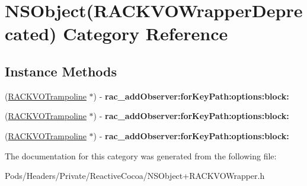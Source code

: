 \hypertarget{category_n_s_object_07_r_a_c_k_v_o_wrapper_deprecated_08}{}\section{N\+S\+Object(R\+A\+C\+K\+V\+O\+Wrapper\+Deprecated) Category Reference}
\label{category_n_s_object_07_r_a_c_k_v_o_wrapper_deprecated_08}
\subsection*{Instance Methods}
\begin{DoxyCompactItemize}
\item 
\mbox{\label{category_n_s_object_07_r_a_c_k_v_o_wrapper_deprecated_08_a34822ef41afb792012df4f28f3d0bbe3}} 
(\mbox{\hyperlink{interface_r_a_c_k_v_o_trampoline}{R\+A\+C\+K\+V\+O\+Trampoline}} $\ast$) -\/ {\bfseries rac\+\_\+add\+Observer\+:for\+Key\+Path\+:options\+:block\+:}
\item 
\mbox{\label{category_n_s_object_07_r_a_c_k_v_o_wrapper_deprecated_08_a34822ef41afb792012df4f28f3d0bbe3}} 
(\mbox{\hyperlink{interface_r_a_c_k_v_o_trampoline}{R\+A\+C\+K\+V\+O\+Trampoline}} $\ast$) -\/ {\bfseries rac\+\_\+add\+Observer\+:for\+Key\+Path\+:options\+:block\+:}
\item 
\mbox{\label{category_n_s_object_07_r_a_c_k_v_o_wrapper_deprecated_08_a34822ef41afb792012df4f28f3d0bbe3}} 
(\mbox{\hyperlink{interface_r_a_c_k_v_o_trampoline}{R\+A\+C\+K\+V\+O\+Trampoline}} $\ast$) -\/ {\bfseries rac\+\_\+add\+Observer\+:for\+Key\+Path\+:options\+:block\+:}
\end{DoxyCompactItemize}


The documentation for this category was generated from the following file\+:\begin{DoxyCompactItemize}
\item 
Pods/\+Headers/\+Private/\+Reactive\+Cocoa/N\+S\+Object+\+R\+A\+C\+K\+V\+O\+Wrapper.\+h\end{DoxyCompactItemize}

